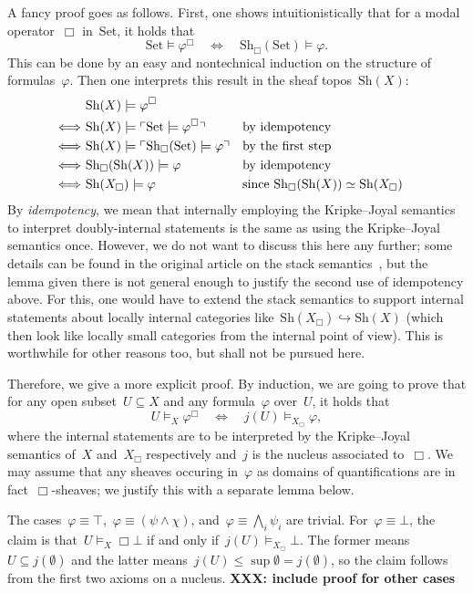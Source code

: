 \documentclass[10pt,reqno,a4paper]{amsbook}
\makeatletter
\theoremstyle{definition}
\theoremstyle{plain}
\theoremstyle{remark}
\newcommand{\Set}{\mathrm{Set}}
\newcommand{\Sh}{\mathrm{Sh}}
\newcommand{\?}{\,{:}\,}
\renewcommand{\_}{\mathpunct{.}\,}
\newcommand{\speak}[1]{\ulcorner\text{\textnormal{#1}}\urcorner}
\newcommand{\XXX}[1]{\textbf{XXX: #1}}
\renewenvironment{proof}[1][\proofname]{\par
  \pushQED{\qed}%
  \normalfont \topsep6\p@\@plus6\p@\relax
  \trivlist
  \item[\hskip\labelsep
        \itshape
    #1\@addpunct{.}]\ignorespaces
}{%
  \popQED\endtrivlist\@endpefalse
}
\makeatother
\begin{document}
\begin{proof}[Proof of Theorem~\ref{thm:box-translation-semantically}]
A fancy proof goes as follows. First, one shows intuitionistically that for a
modal operator~$\Box$ in~$\Set$, it holds that
\[ \Set \models \varphi^\Box \quad\Longleftrightarrow\quad
  \Sh_\Box(\Set) \models \varphi. \]
This can be done by an easy and nontechnical induction on the structure of
formulas~$\varphi$. Then one interprets this result in the sheaf topos~$\Sh(X)$:
\begin{align*}
  &\ \Sh(X) \models \varphi^\Box \\
  \Longleftrightarrow&\
  \Sh(X) \models \speak{$\Set \models \varphi^\Box$} &&\text{by idempotency}\\
  \Longleftrightarrow&\
  \Sh(X) \models \speak{$\Sh_\Box(\Set) \models \varphi$} &&\text{by the first step} \\
  \Longleftrightarrow&\
  \Sh_\Box(\Sh(X)) \models \varphi &&\text{by idempotency} \\
  \Longleftrightarrow&\
  \Sh(X_\Box) \models \varphi &&\text{since~$\Sh_\Box(\Sh(X)) \simeq
  \Sh(X_\Box)$}
\end{align*}
By \emph{idempotency}, we mean that internally employing the Kripke--Joyal
semantics to interpret doubly-internal statements is the same as using the
Kripke--Joyal semantics once. However, we do not want to discuss this here any further;
some details can be found in the original article on the stack
semantics~\cite[Lemma~7.20]{shulman:stack}, but the lemma given there is not
general enough to justify the second use of idempotency above. For this, one
would have to extend the stack semantics to support internal statements about
locally internal categories like~$\Sh(X_\Box) \hookrightarrow \Sh(X)$ (which
then look like locally small categories from the internal point of view). This
is worthwhile for other reasons too, but shall not be pursued here.

Therefore, we give a more explicit proof. By induction, we are going to prove
that for any open subset~$U \subseteq X$ and any formula~$\varphi$ over~$U$, it
holds that
\[ U \models_X \varphi^\Box \quad\Longleftrightarrow\quad j(U) \models_{X_\Box}
\varphi, \]
where the internal statements are to be interpreted by the Kripke--Joyal
semantics of~$X$ and~$X_\Box$ respectively and~$j$ is the nucleus associated
to~$\Box$. We may assume that any sheaves occuring in~$\varphi$ as domains of
quantifications are in fact~$\Box$-sheaves; we justify this with a separate lemma
below.

The cases~$\varphi \equiv \top$,~$\varphi \equiv (\psi \wedge \chi)$,
and~$\varphi \equiv \bigwedge_i \psi_i$ are trivial. For~$\varphi \equiv \bot$,
the claim is that~$U \models_X \Box\bot$ if and only if~$j(U)
\models_{X_\Box} \bot$. The former means~$U \subseteq j(\emptyset)$ and the
latter means~$j(U) \leq \sup \emptyset = j(\emptyset)$, so the claim follows from
the first two axioms on a nucleus.
\end{proof}
\XXX{include proof for other cases}
\end{document}
